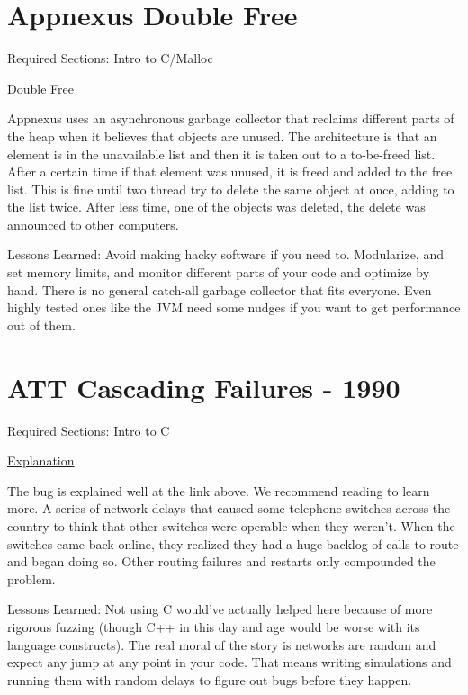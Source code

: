 \section{Appnexus Double Free}

Required Sections: Intro to C/Malloc

\href{https://techblog.appnexus.com/2013-09-17-outage-postmortem-586b19ae4307}{Double Free}

Appnexus uses an asynchronous garbage collector that reclaims different parts of the heap when it believes that objects are unused.
The architecture is that an element is in the unavailable list and then it is taken out to a to-be-freed list.
After a certain time if that element was unused, it is freed and added to the free list.
This is fine until two thread try to delete the same object at once, adding to the list twice. After less time, one of the objects was deleted, the delete was announced to other computers.

Lessons Learned: Avoid making hacky software if you need to. Modularize, and set memory limits, and monitor different parts of your code and optimize by hand. There is no general catch-all garbage collector that fits everyone. Even highly tested ones like the JVM need some nudges if you want to get performance out of them.

\section{ATT Cascading Failures - 1990}

Required Sections: Intro to C

\href{http://users.csc.calpoly.edu/~jdalbey/SWE/Papers/att_collapse.html}{Explanation}

The bug is explained well at the link above.
We recommend reading to learn more.
A series of network delays that caused some telephone switches across the country to think that other switches were operable when they weren't.
When the switches came back online, they realized they had a huge backlog of calls to route and began doing so.
Other routing failures and restarts only compounded the problem.

Lessons Learned: Not using C would've actually helped here because of more rigorous fuzzing (though C++ in this day and age would be worse with its language constructs).
The real moral of the story is networks are random and expect any jump at any point in your code.
That means writing simulations and running them with random delays to figure out bugs before they happen.
